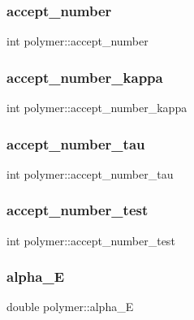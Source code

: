 \subsubsection{\texorpdfstring{accept\+\_\+number}{accept\_number}}
{\footnotesize\ttfamily int polymer\+::accept\+\_\+number}

\hypertarget{classpolymer_a90b569376d792925a187b975d082a76b}{}\label{classpolymer_a90b569376d792925a187b975d082a76b} 
\subsubsection{\texorpdfstring{accept\+\_\+number\+\_\+kappa}{accept\_number\_kappa}}
{\footnotesize\ttfamily int polymer\+::accept\+\_\+number\+\_\+kappa}

\hypertarget{classpolymer_a3c58ebbee07ff914796243d22dd1ee5a}{}\label{classpolymer_a3c58ebbee07ff914796243d22dd1ee5a} 
\subsubsection{\texorpdfstring{accept\+\_\+number\+\_\+tau}{accept\_number\_tau}}
{\footnotesize\ttfamily int polymer\+::accept\+\_\+number\+\_\+tau}

\hypertarget{classpolymer_ab1be653d24606604e177a2ff13948091}{}\label{classpolymer_ab1be653d24606604e177a2ff13948091} 
\subsubsection{\texorpdfstring{accept\+\_\+number\+\_\+test}{accept\_number\_test}}
{\footnotesize\ttfamily int polymer\+::accept\+\_\+number\+\_\+test}

\hypertarget{classpolymer_a318e135320566c15c8a026aee0b530a4}{}\label{classpolymer_a318e135320566c15c8a026aee0b530a4} 
\subsubsection{\texorpdfstring{alpha\+\_\+E}{alpha\_E}}
{\footnotesize\ttfamily double polymer\+::alpha\+\_\+E}

